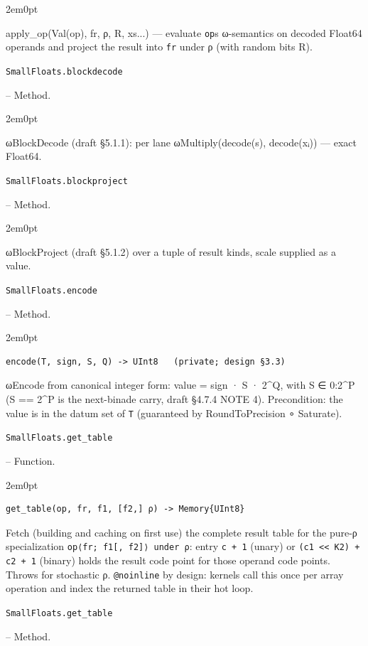 \begin{adjustwidth}{2em}{0pt}

apply\_op(Val(op), fr, ρ, R, xs...) — evaluate \texttt{op}{\textquotesingle}s ω-semantics on decoded Float64 operands and project the result into \texttt{fr} under ρ (with random bits R).



\end{adjustwidth}
\hypertarget{994737666889680542}{\texttt{SmallFloats.blockdecode}}  -- {Method.}

\begin{adjustwidth}{2em}{0pt}

ωBlockDecode (draft §5.1.1): per lane ωMultiply(decode(s), decode(xᵢ)) — exact Float64.



\end{adjustwidth}
\hypertarget{445456126373273252}{\texttt{SmallFloats.blockproject}}  -- {Method.}

\begin{adjustwidth}{2em}{0pt}

ωBlockProject (draft §5.1.2) over a tuple of result kinds, scale supplied as a value.



\end{adjustwidth}
\hypertarget{9707793631963955151}{\texttt{SmallFloats.encode}}  -- {Method.}

\begin{adjustwidth}{2em}{0pt}


\begin{verbatim}
encode(T, sign, S, Q) -> UInt8   (private; design §3.3)
\end{verbatim}

ωEncode from canonical integer form: value = sign · S · 2{\textasciicircum}Q, with S ∈ 0:2{\textasciicircum}P (S == 2{\textasciicircum}P is the next-binade carry, draft §4.7.4 NOTE 4). Precondition: the value is in the datum set of \texttt{T} (guaranteed by RoundToPrecision ∘ Saturate).



\end{adjustwidth}
\hypertarget{10413485981529569906}{\texttt{SmallFloats.get\_table}}  -- {Function.}

\begin{adjustwidth}{2em}{0pt}


\begin{verbatim}
get_table(op, fr, f1, [f2,] ρ) -> Memory{UInt8}
\end{verbatim}

Fetch (building and caching on first use) the complete result table for the pure-ρ specialization \texttt{op⟨fr; f1[, f2]⟩ under ρ}: entry \texttt{c + 1} (unary) or \texttt{(c1 << K2) + c2 + 1} (binary) holds the result code point for those operand code points. Throws for stochastic ρ. \texttt{@noinline} by design: kernels call this once per array operation and index the returned table in their hot loop.



\end{adjustwidth}
\hypertarget{7588185958709694166}{\texttt{SmallFloats.get\_table}}  -- {Method.}

